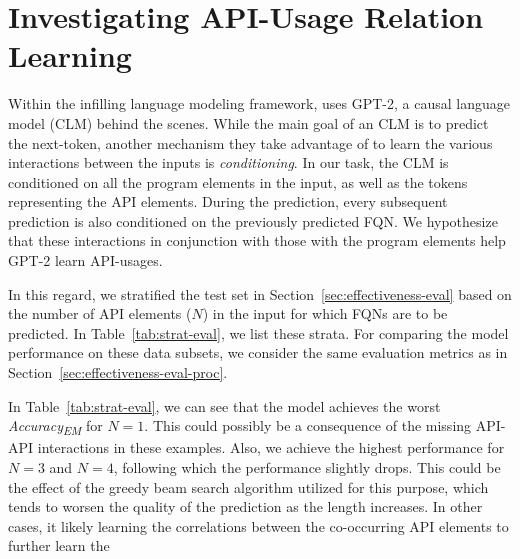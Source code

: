 \section{Investigating API-Usage Relation Learning}
\label{sec:eval}

%

Within the infilling language modeling framework, {\tool} uses GPT-2, a causal language model (CLM) behind the scenes. While the main goal of an CLM is to predict the next-token, another mechanism they take advantage of to learn the various interactions between the inputs is {\em conditioning}. In our task, the CLM is conditioned on all the program elements in the input, as well as the \blank tokens representing the API elements. During the prediction, every subsequent prediction is also conditioned on the previously predicted FQN. We hypothesize that these interactions in conjunction with those with the program elements help GPT-2 learn API-usages.

In this regard, we stratified the test set in Section~\ref{sec:effectiveness-eval} based on the number of API elements ($N$) in the input for which FQNs are to be predicted. In Table~\ref{tab:strat-eval}, we list these strata. For comparing the model performance on these data subsets, we consider the same evaluation metrics as in Section~\ref{sec:effectiveness-eval-proc}.

In Table~\ref{tab:strat-eval}, we can see that the model achieves the worst \textit{Accuracy\textsubscript{EM}} for $N=1$. This could possibly be a consequence of the missing API-API interactions in these examples. Also, we achieve the highest performance for $N=3$ and $N=4$, following which the performance slightly drops. This could be the effect of the greedy beam search algorithm utilized for this purpose, which tends to worsen the quality of the prediction as the length increases. In other cases, it likely learning the correlations between the co-occurring API elements to further learn the